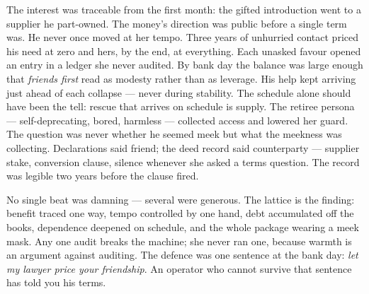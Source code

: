 \begin{lattice}
   The interest was traceable from the first month: the gifted introduction went to a supplier he part-owned. The money's direction was public before a single term was.
   He never once moved at her tempo. Three years of unhurried contact priced his need at zero and hers, by the end, at everything.
   Each unasked favour opened an entry in a ledger she never audited. By bank day the balance was large enough that \emph{friends first} read as modesty rather than as leverage.
   His help kept arriving just ahead of each collapse --- never during stability. The schedule alone should have been the tell: rescue that arrives on schedule is supply.
   The retiree persona --- self-deprecating, bored, harmless --- collected access and lowered her guard. The question was never whether he seemed meek but what the meekness was collecting.
   Declarations said friend; the deed record said counterparty --- supplier stake, conversion clause, silence whenever she asked a terms question. The record was legible two years before the clause fired.
\end{lattice}

\begin{lesson}
No single beat was damning --- several were generous. The lattice is the finding: benefit traced one way, tempo controlled by one hand, debt accumulated off the books, dependence deepened on schedule, and the whole package wearing a meek mask. Any one audit breaks the machine; she never ran one, because warmth is an argument against auditing. The defence was one sentence at the bank day: \emph{let my lawyer price your friendship}. An operator who cannot survive that sentence has told you his terms.
\end{lesson}
